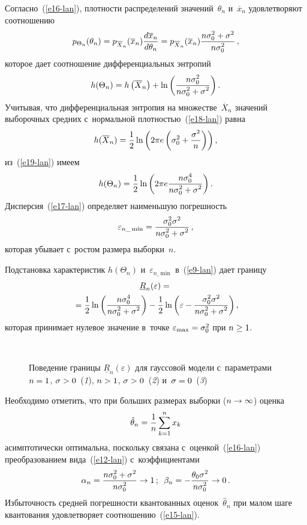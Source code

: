\begin{multicols}{2}
Согласно~(\ref{e16-lan}), плотности распределений значений~$\theta_n$ и~$\overline{x}_n$ 
удовле\-тво\-ря\-ют соотношению 
$$
p_{\Theta_n}(\theta_n) =p_{\overline{X}_n} (\overline{x}_n)\displaystyle\frac{\displaystyle d\overline{x}_n\mathstrut}{\displaystyle d\theta_n\mathstrut} = 
p_{\overline{X}_n}(\overline{x}_n) \displaystyle\frac{\displaystyle n\sigma_0^2+\sigma^2\mathstrut}{\displaystyle n\sigma_0^2\mathstrut}\,,
$$
которое дает соотношение дифференциальных энтропий
\begin{equation}
h(\Theta_n) =h\left( \overline{X}_n\right) +\ln \left( 
\displaystyle\frac{\displaystyle n\sigma_0^2\mathstrut}{\displaystyle n\sigma_0^2+\sigma^2\mathstrut}\right).
\label{e19-lan}
\end{equation}
Учитывая, что дифференциальная энтропия на множестве~$\overline{X}_n$ значений 
выборочных сред\-них с~нормальной плот\-ностью~(\ref{e18-lan}) равна 
$$
h(\overline{X}_n)=\displaystyle\frac{\displaystyle 1\mathstrut}{\displaystyle 2\mathstrut} \ln \left(2\pi e \left(\sigma_0^2+ \displaystyle\frac{\displaystyle \sigma^2\mathstrut}{\displaystyle n\mathstrut}\right)\right),
$$
 из~(\ref{e19-lan}) имеем 
 $$
 h(\Theta_n) = \displaystyle\frac{\displaystyle 1\mathstrut}{\displaystyle 2\mathstrut} 
\ln \left(2\pi e  \displaystyle\frac{\displaystyle n\sigma_0^4\mathstrut}{\displaystyle n\sigma_0^2+ \sigma^2\mathstrut}\right).
$$
 Дисперсия~(\ref{e17-lan}) определяет 
наименьшую по\-греш\-ность
$$
\varepsilon_{n\_\min} = \fr{\sigma_0^2 \sigma^2}{n\sigma_0^2\hm+ 
\sigma^2}\,,
$$
 которая убывает с~рос\-том размера выборки~$n$.

Подстановка характеристик $h(\Theta_n)$ и~$\varepsilon_{n\_\min}$ в~(\ref{e9-lan}) дает 
границу 
\begin{multline}
\underline{R}_n(\varepsilon)={}\\
{}= \displaystyle\frac{\displaystyle 1\mathstrut}{\displaystyle 2\mathstrut} \ln \left( \displaystyle\frac{\displaystyle n\sigma_0^4\mathstrut}{\displaystyle n\sigma_0^2+\sigma^2\mathstrut}\right) -
\displaystyle\frac{\displaystyle 1\mathstrut}{\displaystyle 2\mathstrut} \ln \left( \varepsilon - \displaystyle\frac{\displaystyle \sigma_0^2 \sigma^2\mathstrut}{\displaystyle n\sigma_0^2+\sigma^2\mathstrut}\right),
\label{e20-lan}
\end{multline}
которая принимает нулевое значение в~точке $\varepsilon_{\max} \hm= \sigma_0^2$ при 
$n\hm\geq 1$. 


\begin{figure*} %
  \vspace*{1pt}
      \begin{center}
     \mbox{%
\epsfxsize=127.646mm 
}

\vspace*{3pt}

\noindent
{\small Поведение границы $\underline{R}_n(\varepsilon)$ для гауссовой модели с~параметрами 
$n\hm=1$, $\sigma\hm>0$~(\textit{1}),  $n\hm>1$, $\sigma\hm >0$~(\textit{2}) и~$\sigma\hm=0$~(\textit{3})}

\end{center}
\end{figure*}

Необходимо отметить, что при больших размерах выборки ($n\hm\to \infty$) оцен\-ка 
$$
\hat{\theta}_n= \displaystyle\frac{\displaystyle 1\mathstrut}{\displaystyle n\mathstrut} \sum\limits^n_{k=1} x_k
$$ 
асимптотически оптимальна, поскольку 
связана с~оценкой~(\ref{e16-lan}) преобразованием вида~(\ref{e12-lan}) с~коэффициентами 
$$
\alpha_n= \fr{n\sigma_0^2\hm+\sigma^2}{n\sigma_0^2} \to 1\,;
\enskip
\beta_n= -\fr{\theta_0\sigma^2}{n\sigma_0^2}\to 0\,.
$$
 Из\-бы\-точ\-ность сред\-ней по\-греш\-ности квантованных 
оценок~$\hat{\theta}_n$ при малом шаге квантования удовле\-тво\-ря\-ет  
соотношению~(\ref{e15-lan}).


\end{multicols}
